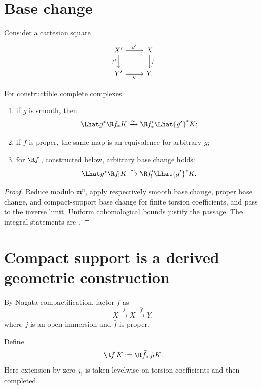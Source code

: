 \section{Base change}

Consider a cartesian square
\begin{equation}
\label{eq:six-base-change-square}
\begin{tikzcd}
X' \arrow[r,"g'"] \arrow[d,"f'"'] & X \arrow[d,"f"] \\
Y' \arrow[r,"g"'] & Y .
\end{tikzcd}
\end{equation}

\begin{theorem}
\label{thm:proetale-base-change}
For constructible complete complexes:
\begin{enumerate}
\item if \(g\) is smooth, then
\[
 \Lhat g^*\R f_*K
   \xrightarrow{\sim}
 \R f'_*\Lhat {g'}^*K;
\]
\item if \(f\) is proper, the same map is an equivalence for arbitrary
      \(g\);
\item for \(\R f_!\), constructed below, arbitrary base change holds:
\[
 \Lhat g^*\R f_!K
   \xrightarrow{\sim}
 \R f'_!\Lhat {g'}^*K.
\]
\end{enumerate}
\end{theorem}

\begin{proof}
Reduce modulo \(\mathfrak m^n\), apply respectively smooth base change,
proper base change, and compact-support base change for finite torsion
coefficients, and pass to the inverse limit.  Uniform cohomological bounds
justify the passage.  The integral statements are
\cite[Lemmas~6.7.4, 6.7.5, and 6.7.10]{BhattScholzeProEtale}.
\end{proof}

\section{Compact support is a derived geometric construction}

By Nagata compactification, factor \(f\) as
\[
 X\xrightarrow{j}\overline X\xrightarrow{\bar f}Y,
\]
where \(j\) is an open immersion and \(\bar f\) is proper.

\begin{definition}
\label{def:proetale-fshriek}
Define
\begin{equation}
\label{eq:fshriek-compactification}
 \R f_!K:=\R\bar f_*\,j_!K.
\end{equation}
Here extension by zero \(j_!\) is taken levelwise on torsion coefficients and
then completed.
\end{definition}

